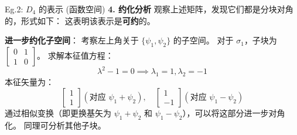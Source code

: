 \begin{example}{Eg.2: $D_4$ 的表示 (函数空间)}
    \textbf{4. 约化分析}
    观察上述矩阵，发现它们都是分块对角的，形式如下：
    这表明该表示是\textbf{可约}的。
    
    \textbf{进一步约化子空间}：
    考察左上角关于 $\{\psi_1, \psi_2\}$ 的子空间。
    对于 $\sigma_1$，子块为 $\begin{bmatrix} 0 & 1 \\ 1 & 0 \end{bmatrix}$。
    求解本征值方程：
    \begin{equation}
        \lambda^2 - 1 = 0 \implies \lambda_1 = 1, \lambda_2 = -1
    \end{equation}
    本征矢量为：
    \begin{equation}
        \begin{bmatrix} 1 \\ 1 \end{bmatrix} (\text{对应 } \psi_1 + \psi_2), \quad \begin{bmatrix} 1 \\ -1 \end{bmatrix} (\text{对应 } \psi_1 - \psi_2)
    \end{equation}
    通过相似变换（即更换基矢为 $\psi_1+\psi_2$ 和 $\psi_1-\psi_2$），可以将这部分进一步对角化。
    同理可分析其他子块。
\end{example}




